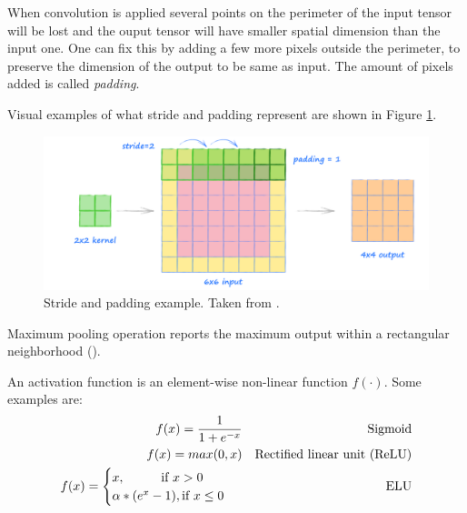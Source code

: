 \begin{definition}[Padding]
	When convolution is applied several points on the perimeter of the input tensor will be lost and the ouput tensor will have smaller spatial dimension than the input one. One can fix this by adding a few more pixels outside the perimeter, to preserve the dimension of the output to be same as input. The amount of pixels added is called \textit{padding}. 
\end{definition}

Visual examples of what stride and padding represent are shown in Figure \ref{fig:stride}.
\begin{figure}[htb]
	\begin{center}
		\includegraphics[width=0.6\linewidth]{bilder/stride_padding.png}
		\caption[Stride and padding example]%
		{Stride and padding example. Taken from \cite{stride}.}
		\label{fig:stride}
	\end{center}
\end{figure}

\begin{definition}
	Maximum pooling operation reports the maximum output within a rectangular neighborhood (\cite{Goodfellow_2016}).
\end{definition}

\begin{definition}
	An activation function is an element-wise non-linear function $f(\cdot)$. Some examples are:
	\begin{align}             
		f(x) = \frac{1}{1 + e^{-x}} &&\text{Sigmoid} \\      
		f(x) = max(0, x) &&\text{Rectified linear unit (ReLU)}\\
		f(x) = \begin{cases}
				x, \hspace*{1cm} \textrm{if } x > 0 \\
				\alpha * (e^{x} - 1), \textrm{if }  x \leq 0
		  	\end{cases}\ &&\text{ELU}
		\end{align}
\end{definition}


